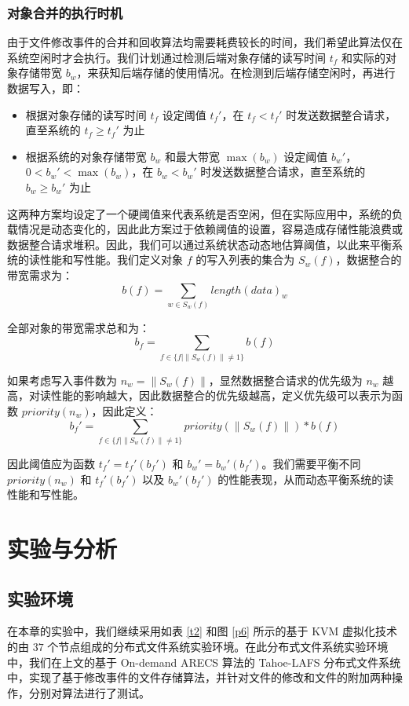 \subsubsection{对象合并的执行时机}
由于文件修改事件的合并和回收算法均需要耗费较长的时间，我们希望此算法仅在系统空闲时才会执行。我们计划通过检测后端对象存储的读写时间 $t_{f}$ 和实际的对象存储带宽 $b_{w}$，来获知后端存储的使用情况。在检测到后端存储空闲时，再进行数据写入，即：

\begin{itemize}
\item 根据对象存储的读写时间 $t_{f}$ 设定阈值 $t_{f}'$，在 $t_{f}<t_{f}'$ 时发送数据整合请求，直至系统的 $t_{f} \geq t_{f}'$ 为止
\item 根据系统的对象存储带宽 $b_{w}$ 和最大带宽 $\max(b_{w})$ 设定阈值 $b_{w}'$，$0<b_{w}'<\max(b_{w})$，在 $b_{w}<b_{w}'$ 时发送数据整合请求，直至系统的 $b_{w} \geq b_{w}'$ 为止
\end{itemize}

这两种方案均设定了一个硬阈值来代表系统是否空闲，但在实际应用中，系统的负载情况是动态变化的，因此此方案过于依赖阈值的设置，容易造成存储性能浪费或数据整合请求堆积。因此，我们可以通过系统状态动态地估算阈值，以此来平衡系统的读性能和写性能。我们定义对象 $f$ 的写入列表的集合为 $S_{w}(f)$，数据整合的带宽需求为：
$$
b(f)=\sum_{w{\in}S_{w}(f)}length(data)_{w}
$$

全部对象的带宽需求总和为：
$$
b_{f}=\sum_{f{\in}\{f|\|S_{w}(f)\|{\ne}1\}}b(f)
$$

如果考虑写入事件数为 $n_{w}=\|S_{w}(f)\|$，显然数据整合请求的优先级为 $n_{w}$ 越高，对读性能的影响越大，因此数据整合的优先级越高，定义优先级可以表示为函数 $priority(n_{w})$，因此定义：
$$
b_{f}'=\sum_{f{\in}\{f|\|S_{w}(f)\|{\ne}1\}}priority(\|S_{w}(f)\|)*b(f)
$$

因此阈值应为函数 $t_{f}'=t_{f}'(b_{f}')$ 和 $b_{w}'=b_{w}'(b_{f}')$。我们需要平衡不同 $priority(n_{w})$ 和 $t_{f}'(b_{f}')$ 以及 $b_{w}'(b_{f}')$ 的性能表现，从而动态平衡系统的读性能和写性能。
\section{实验与分析}
\subsection{实验环境}
在本章的实验中，我们继续采用如表 \ref{t2} 和图 \ref{p6} 所示的基于 KVM 虚拟化技术的由 $37$ 个节点组成的分布式文件系统实验环境。在此分布式文件系统实验环境中，我们在上文的基于 On-demand ARECS 算法的 Tahoe-LAFS 分布式文件系统中，实现了基于修改事件的文件存储算法，并针对文件的修改和文件的附加两种操作，分别对算法进行了测试。
